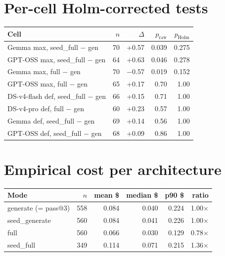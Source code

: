 \documentclass{article}
\begin{document}
\section{Per-cell Holm-corrected tests}
\label{app:percell}

\begin{table}[h]
  \centering
  \small
  \begin{tabular}{lrrrr}
    \toprule
    Cell & $n$ & $\Delta$ & $p_{\text{raw}}$ & $p_{\text{Holm}}$ \\
    \midrule
    Gemma max, seed\_full $-$ gen & 70 & +0.57 & 0.039 & 0.275 \\
    GPT-OSS max, seed\_full $-$ gen & 64 & +0.63 & 0.046 & 0.278 \\
    Gemma max, full $-$ gen & 70 & $-$0.57 & 0.019 & 0.152 \\
    GPT-OSS max, full $-$ gen & 65 & +0.17 & 0.70 & 1.00 \\
    DS-v4-flash def, seed\_full $-$ gen & 66 & +0.15 & 0.71 & 1.00 \\
    DS-v4-pro def, full $-$ gen & 60 & +0.23 & 0.57 & 1.00 \\
    Gemma def, seed\_full $-$ gen & 69 & +0.14 & 0.56 & 1.00 \\
    GPT-OSS def, seed\_full $-$ gen & 68 & +0.09 & 0.86 & 1.00 \\
    \bottomrule
  \end{tabular}
\end{table}

\section{Empirical cost per architecture}
\label{app:cost}

\begin{table}[h]
  \centering
  \small
  \begin{tabular}{lrrrrr}
    \toprule
    Mode & $n$ & mean \$ & median \$ & p90 \$ & ratio \\
    \midrule
    generate (= pass@3) & 558 & 0.084 & 0.040 & 0.224 & 1.00$\times$ \\
    seed\_generate & 560 & 0.084 & 0.041 & 0.226 & 1.00$\times$ \\
    full & 560 & 0.066 & 0.030 & 0.129 & 0.78$\times$ \\
    seed\_full & 349 & 0.114 & 0.071 & 0.215 & 1.36$\times$ \\
    \bottomrule
  \end{tabular}
\end{table}
\end{document}
